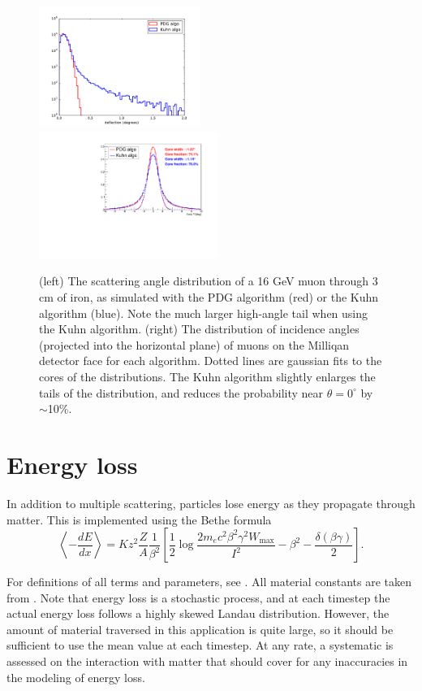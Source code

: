 \documentclass[11pt]{article}
\begin{document}
\begin{figure}
\centering
\includegraphics[width=0.47\textwidth]{plots/pdg_kuhn_single_comp.pdf}
\includegraphics[width=0.52\textwidth]{plots/pdg_kuhn_final_comp.pdf}
\caption{(left) The scattering angle distribution of a 16 GeV muon through 3 cm of iron, as simulated with the PDG algorithm (red) or the Kuhn algorithm (blue). 
Note the much larger high-angle tail when using the Kuhn algorithm.
(right) The distribution of incidence angles (projected into the horizontal plane) of muons on the Milliqan detector face for each algorithm.
Dotted lines are gaussian fits to the cores of the distributions. The Kuhn algorithm slightly
enlarges the tails of the distribution, and reduces the probability near $\theta=0^\circ$ by $\sim$10\%.}
\label{fig:msccomp}
\end{figure}

\section{Energy loss}
In addition to multiple scattering, particles lose energy as they propagate through matter. This is implemented using the 
Bethe formula
\begin{equation}\label{eq:dedx}
\left\langle-\frac{dE}{dx}\right\rangle = Kz^2\frac{Z}{A}\frac{1}{\beta^2}\left[\frac{1}{2}\log\frac{2m_ec^2\beta^2\gamma^2W_\text{max}}{I^2} - \beta^2 - \frac{\delta(\beta\gamma)}{2} \right].
\end{equation}

For definitions of all terms and parameters, see \cite{PDG_matter}. All material constants are taken from \cite{PDG_properties}.
Note that energy loss is a stochastic process, and at each timestep the actual energy loss follows a highly skewed Landau distribution.
However, the amount of material traversed in this application is quite large, so it should be sufficient to use the mean value
at each timestep. At any rate, a systematic is assessed on the interaction with matter that should cover for any inaccuracies
in the modeling of energy loss.
\end{document}
